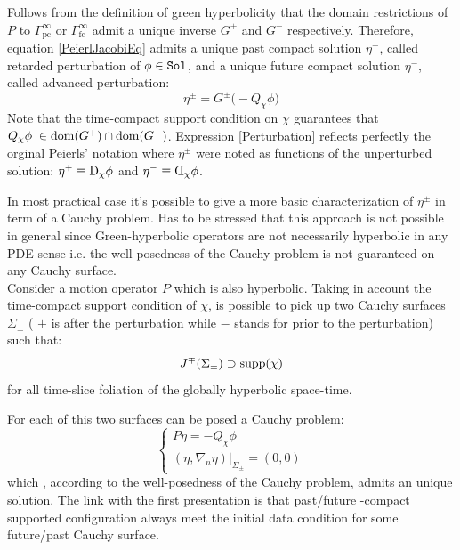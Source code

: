 \documentclass[Main]{subfiles}
\begin{document}
		 Follows from the definition of green hyperbolicity that the domain restrictions of $P$ to $\Gamma^\infty_{\textrm{pc}}$ or $\Gamma^\infty_{\textrm{fc}}$ admit a unique inverse $G^+$ and $G^-$ respectively.
   		Therefore, equation \ref{PeierlJacobiEq} admits a unique past compact solution $\eta^+$, called retarded perturbation of $\phi\in \mathtt{Sol}$, and a unique future compact solution $\eta^-$, called advanced perturbation:
   		\begin{equation}\label{Perturbation}
   			\eta^\pm = G^\pm \big( - Q_\chi \phi \big)
   		\end{equation}
   		Note that the time-compact support condition on $\chi$ guarantees that $Q_\chi \phi \; \in \mathrm{dom}(G^+) \cap \mathrm{dom}(G^-)$.
   		Expression \ref{Perturbation} reflects perfectly the orginal Peierls' notation where $\eta^\pm$ were noted as functions of the unperturbed solution: $\eta^+ \equiv\reflectbox{\reflectbox{D}}_\chi \phi$ and $\eta^- \equiv  \reflectbox{D}_\chi \phi$.
		
		
		\begin{observation}
			In most practical case it's possible to give a more basic characterization of $\eta^\pm$ in term of a Cauchy problem.
			Has to be stressed that this approach is not possible in general since Green-hyperbolic operators are not necessarily hyperbolic in any PDE-sense i.e. the well-posedness of the Cauchy problem is not guaranteed on any Cauchy surface. \cite[pag 1]{Bar} \cite[remark 3.18]{Bar2010}\cite[remark 2.1]{Khavkine2014}
			\\
			Consider a motion operator $P$ which is also hyperbolic.
		Taking in account the time-compact support condition of $\chi$, is possible to pick up  two Cauchy surfaces $\Sigma_\pm$ ( $+$ is after the perturbation while $-$ stands for prior to the perturbation) such that:
		\begin{displaymath}
			J^\mp (\Sigma_\pm) \supset \textrm{supp}(\chi) 
		\end{displaymath}
		for all time-slice foliation of the globally hyperbolic space-time.

		For each of this two surfaces can be posed a Cauchy problem:
		\begin{equation}\label{PerturbationCauchyProblem}
		   \begin{cases}
			   P \eta = - Q_\chi \phi \\
			   (\eta, \nabla_n \eta ) \big \vert_{\Sigma_{\pm}} = (0,0)
   			\end{cases}
   		\end{equation}
   		which , according to the well-posedness of the Cauchy problem, admits an unique solution.
   		The link with the first presentation is that past/future -compact supported configuration always meet the initial data condition for some future/past Cauchy surface.
		\end{observation}
		
\end{document}
